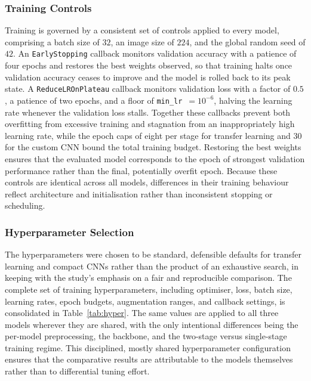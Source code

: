 \subsubsection{Training Controls}
\label{subsubsec:method-controls}

Training is governed by a consistent set of controls applied to every model, comprising a batch size of $32$, an image size of $224$, and the global random seed of $42$.
An \texttt{EarlyStopping} callback monitors validation accuracy with a patience of four epochs and restores the best weights observed, so that training halts once validation accuracy ceases to improve and the model is rolled back to its peak state.
A \texttt{ReduceLROnPlateau} callback monitors validation loss with a factor of $0.5$, a patience of two epochs, and a floor of \texttt{min\_lr}~$=10^{-6}$, halving the learning rate whenever the validation loss stalls.
Together these callbacks prevent both overfitting from excessive training and stagnation from an inappropriately high learning rate, while the epoch caps of eight per stage for transfer learning and $30$ for the custom CNN bound the total training budget.
Restoring the best weights ensures that the evaluated model corresponds to the epoch of strongest validation performance rather than the final, potentially overfit epoch.
Because these controls are identical across all models, differences in their training behaviour reflect architecture and initialisation rather than inconsistent stopping or scheduling.

\subsubsection{Hyperparameter Selection}
\label{subsubsec:method-hyper}

The hyperparameters were chosen to be standard, defensible defaults for transfer learning and compact CNNs rather than the product of an exhaustive search, in keeping with the study's emphasis on a fair and reproducible comparison.
The complete set of training hyperparameters, including optimiser, loss, batch size, learning rates, epoch budgets, augmentation ranges, and callback settings, is consolidated in Table~\ref{tab:hyper}.
The same values are applied to all three models wherever they are shared, with the only intentional differences being the per-model preprocessing, the backbone, and the two-stage versus single-stage training regime.
This disciplined, mostly shared hyperparameter configuration ensures that the comparative results are attributable to the models themselves rather than to differential tuning effort.

